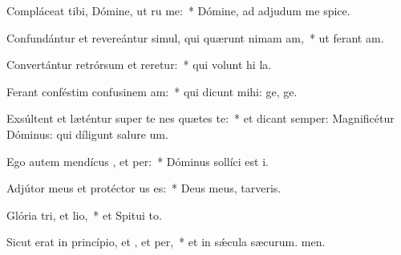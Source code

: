 \item Compláceat tibi, Dómine, ut ru me:~* Dómine, ad adjudum me spice.
\item Confundántur et revereántur simul, qui quærunt nimam am,~* ut ferant am.
\item Convertántur retrórsum et reretur:~* qui volunt hi la.
\item Ferant conféstim confusinem am:~* qui dicunt mihi: ge, ge.
\item Exsúltent et læténtur super te nes quætes te:~* et dicant semper: Magnificétur Dóminus: qui díligunt salure um.
\item Ego autem mendícus , et per:~* Dóminus sollíci est i.
\item Adjútor meus et protéctor us  es:~* Deus meus,  tarveris.
\item Glória tri, et lio,~* et Spitui to.
\item Sicut erat in princípio, et , et per,~* et in sǽcula sæcurum. men.
